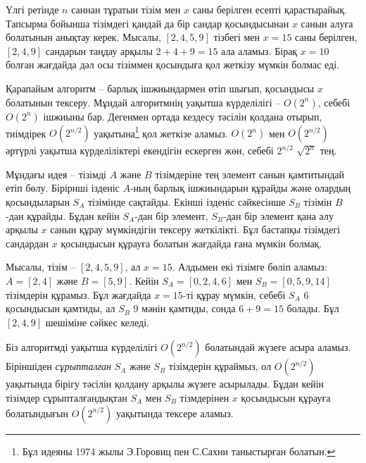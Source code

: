 Үлгі ретінде $n$ саннан тұратын тізім мен $x$ саны берілген есепті қарастырайық.
Тапсырма бойынша тізімдегі қандай да бір сандар қосындысынан $x$ санын алуға болатынын анықтау керек.
Мысалы, $[2,4,5,9]$ тізбегі мен $x=15$ саны берілген,
$[2,4,9]$ сандарын таңдау арқылы $2+4+9=15$ ала аламыз.
Бірақ $x=10$ болған жағдайда дәл осы тізіммен қосындыға қол жеткізу мүмкін болмас еді.

Қарапайым алгоритм -- барлық ішжиындармен өтіп шығып, 
қосындысы $x$ болатынын тексеру.
Мұндай алгоритмнің уақытша күрделілігі -- $O(2^n)$,
себебі $O(2^n)$ ішжиыны бар. Дегенмен ортада кездесу тәсілін қолдана отырып,
тиімдірек $O(2^{n/2})$ уақытына\footnote{Бұл идеяны 1974 жылы Э.Горовиц пен С.Сахни  
таныстырған болатын\cite{hor74}.} қол жеткізе аламыз.
$O(2^n)$ мен $O(2^{n/2})$ әртүрлі уақытша күрделіліктері екендігін ескерген жөн,
себебі $2^{n/2}$ $\sqrt{2^n}$ тең.

Мұндағы идея -- тізімді $A$ және $B$ тізімдеріне 
тең элемент санын қамтитындай етіп бөлу.
Бірірнші ізденіс $A$-ның барлық ішжиындарын
құрайды және олардың қосындыларын $S_A$ тізімінде сақтайды.
Екінші ізденіс сәйкесінше $S_B$ тізімін $B$-дан құрайды. 
Бұдан кейін $S_A$-дан бір элемент, $S_B$-дан бір элемент қана алу арқылы 
$x$ санын құрау мүмкіндігін тексеру жеткілікті.
Бұл бастапқы тізімдегі сандардан $x$ қосындысын құрауға болатын жағдайда ғана  мүмкін болмақ.

Мысалы, тізім -- $[2,4,5,9]$, ал $x=15$.
Алдымен екі тізімге бөліп аламыз: $A=[2,4]$ және $B=[5,9]$.
Кейін $S_A=[0,2,4,6]$ мен $S_B=[0,5,9,14]$ тізімдерін құрамыз.
Бұл жағдайда $x=15$-ті құрау мүмкін, себебі $S_A$ $6$ қосындысын қамтиды,
ал $S_B$ $9$ мәнін қамтиды, сонда $6+9=15$ болады.
Бұл $[2,4,9]$ шешіміне сәйкес келеді.

Біз алгоритмді уақытша күрделілігі $O(2^{n/2})$ болатындай
жүзеге асыра аламыз.
Біріншіден \emph{сұрыпталған} $S_A$ және $S_B$ тізімдерін құраймыз,
ол $O(2^{n/2})$ уақытында бірігу тәсілін қолдану арқылы жүзеге асырылады.
Бұдан кейін тізімдер сұрыпталғандықтан $S_A$ мен $S_B$ тізмдерінен 
$x$ қосындысын құрауға болатындығын $O(2^{n/2})$ уақытында тексере аламыз.